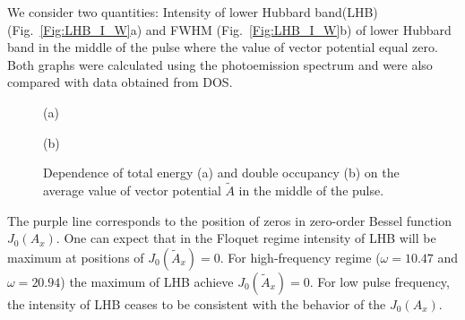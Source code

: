We consider two quantities: Intensity of lower Hubbard band(LHB) (Fig.~\ref{Fig:LHB_I_W}a) and FWHM (Fig.~\ref{Fig:LHB_I_W}b) of lower Hubbard band in the middle of the pulse where the value of vector potential equal zero. Both graphs were calculated using the photoemission spectrum and were also compared with data obtained from DOS.
\begin{figure}[h!]
\begin{minipage}[h]{0.5\linewidth}
 (a) \\
\end{minipage}
\hfill
\begin{minipage}[h]{0.5\linewidth}
 (b) \\
\end{minipage}
\caption{Dependence of total energy (a) and double occupancy (b) on the average value of vector potential $\tilde{A}$ in the middle of the pulse.}
\label{Fig:E_tot_docc_KH}
\end{figure}
The purple line corresponds to the position of zeros in zero-order Bessel function $J_0(A_x)$. One can expect that in the Floquet regime intensity of LHB will be maximum at positions of $J_0(\tilde{A}_x)=0$. For high-frequency regime ($\omega=10.47$ and $\omega=20.94$) the maximum of LHB achieve $J_0(\tilde{A}_x)=0$. For low pulse frequency, the intensity of LHB ceases to be consistent with the behavior of the $J_0(A_x)$.

